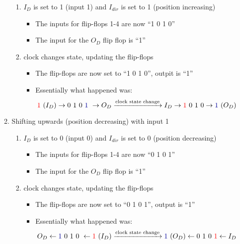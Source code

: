 \documentclass[11pt]{article} %
\begin{document}
\begin{enumerate}[(a)]
\begin{enumerate}
\begin{enumerate}
			\item $I_D$ is set to 1 (input 1) and $I_{dir}$ is set to 1 (position increasing)\begin{itemize}
				\item The inputs for flip-flops 1-4 are now ``1 0 1 0''
				\item The input for the $O_D$ flip flop is ``1''
			\end{itemize}
			\item clock changes state, updating the flip-flops\begin{itemize}
				\item The flip-flops are now set to ``1 0 1 0'', outpit is ``1''
				\item Essentially what happened was: \[ \textcolor{red}{1}\ (I_D)\rightarrow 0\ 1\ 0\ \textcolor{darkBlue}{1}\ \rightarrow O_D \xrightarrow{\text{clock state change}} I_D \rightarrow \textcolor{red}{1}\ 0\ 1\ 0\rightarrow \textcolor{darkBlue}{1}\ (O_D) \]
			\end{itemize}
		\end{enumerate}
		\item Shifting upwards (position decreasing) with input 1\begin{enumerate}
			\item $I_D$ is set to 0 (input 0) and $I_{dir}$ is set to 0 (position decreasing)\begin{itemize}
				\item The inputs for flip-flops 1-4 are now ``0 1 0 1''
				\item The input for the $O_D$ flip flop is ``1''
			\end{itemize}
			\item clock changes state, updating the flip-flops\begin{itemize}
				\item The flip-flops are now set to ``0 1 0 1'', output is ``1''
				\item Essentially what happened was: \[ O_D\leftarrow \textcolor{darkBlue}{1}\ 0\ 1\ 0\ \leftarrow \textcolor{red}{1}\ (I_D) \xrightarrow{\text{clock state change}}  \textcolor{darkBlue}{1}\ (O_D)\leftarrow 0\ 1\ 0\ \textcolor{red}{1}\leftarrow I_D \]
			\end{itemize}
		\end{enumerate}
	\end{enumerate}
\end{enumerate}
\end{document}
